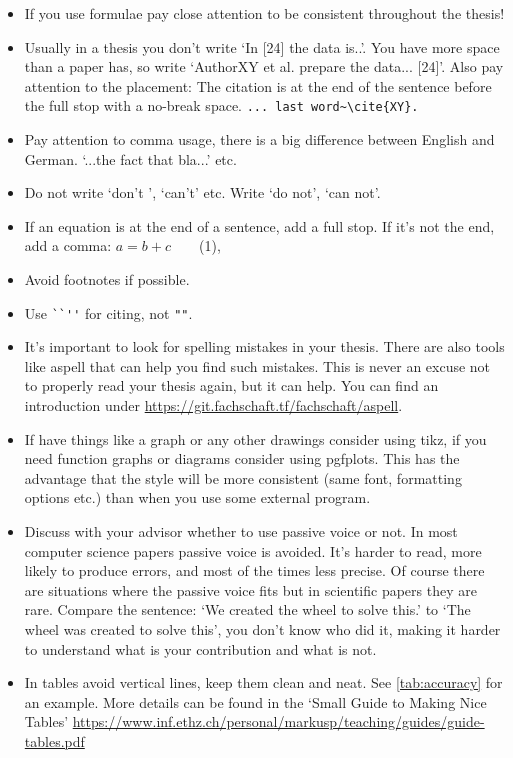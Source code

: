     \begin{itemize}

        \item If you use formulae pay close attention to be consistent throughout the thesis!

        \item Usually  in a thesis you don't write `In [24] the data is..'. You have more space than a paper has, so write `AuthorXY et al. prepare the data... [24]'. Also pay attention to the placement: The citation is at the end of the sentence before the full stop with a no-break space. \verb|... last word~\cite{XY}.|

        \item Pay attention to comma usage, there is a big difference between English and German. `...the fact that bla...' etc.

        \item Do not write `don't ', `can't' etc. Write `do not', `can not'.

        \item If an equation is at the end of a sentence, add a full stop. If it's not the end, add a comma: {$a= b + c$~~~~(1),}

        \item Avoid footnotes if possible.

        \item Use \verb|``''| for citing, not \verb|""|.

        \item It's important to look for spelling mistakes in your thesis. There are also tools like aspell that can help you find such mistakes.
        This is never an excuse not to properly read your thesis again, but it can help.
        You can find an introduction under \url{https://git.fachschaft.tf/fachschaft/aspell}.

        \item If have things like a graph or any other drawings consider using tikz, if you need function graphs or diagrams consider using pgfplots.
        This has the advantage that the style will be more consistent (same font, formatting options etc.) than when you use some external program.

        \item Discuss with your advisor whether to use passive voice or not. In most computer science papers passive voice is avoided. It's harder to read, more likely to produce errors, and most of the times less precise. Of course there are situations where the passive voice fits but in scientific papers they are rare. Compare the sentence: `We created the wheel to solve this.' to `The wheel was created to solve this', you don't know who did it, making it harder to understand what is your contribution and what is not.

        \item In tables avoid vertical lines, keep them clean and neat. See \ref{tab:accuracy} for an example. More details can be found in the `Small Guide to Making Nice Tables' \url{https://www.inf.ethz.ch/personal/markusp/teaching/guides/guide-tables.pdf}

    \end{itemize}


